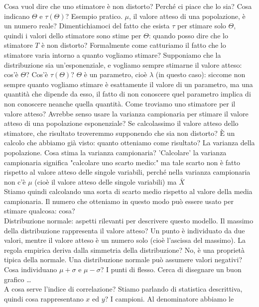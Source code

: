 \documentclass{article}
\begin{document}
    Cosa vuol dire che uno stimatore è non distorto? Perché ci piace che lo sia? Cosa indicano $ \Theta $ e $ \tau ( \Theta ) $? Esempio pratico. $ \mu $, il valore atteso di
    una popolazione, è un numero reale? Dimentichiamoci del fatto che esista $ \tau $ per stimare solo $ \Theta $, quindi i valori dello stimatore sono stime per $ \Theta $:
    quando posso dire che lo stimatore $ T $ è non distorto? Formalmente come catturiamo il fatto che lo stimatore varia intorno a quanto vogliamo stimare? Supponiamo che la
    distribuzione sia un'esponenziale, e vogliamo sempre stimarne il valore atteso: cos'è $ \Theta $? Cos'è $ \tau ( \Theta ) $? $ \Theta $ è un parametro, cioè $ \lambda $
    (in questo caso): siccome non sempre quanto vogliamo stimare è esattamente il valore di un parametro, ma una quantità che dipende da esso, il fatto di non conoscere quel
    parametro implica di non conoscere neanche quella quantità. Come troviamo uno stimatore per il valore atteso? Avrebbe senso usare la varianza campionaria per stimare il
    valore atteso di una popolazione esponenziale? Se calcolassimo il valore atteso dello stimatore, che risultato troveremmo supponendo che sia non distorto? È un calcolo che
    abbiamo già visto: quanto otteniamo come risultato? La varianza della popolazione. Cosa stima la varianza campionaria? 'Calcolare' la varianza campionaria significa
    "calcolare uno scarto medio:" ma tale scarto non è fatto rispetto al valore atteso delle singole variabili, perché nella varianza campionaria non c'è $ \mu $ (cioè il
    valore atteso delle singole variabili) ma $ \bar X $ \\
    Stiamo quindi calcolando una sorta di scarto medio rispetto al valore della media campionaria. Il numero che otteniamo in questo modo può essere usato per stimare
    qualcosa: cosa? \\
    Distribuzione normale: aspetti rilevanti per descrivere questo modello. Il massimo della distribuzione rappresenta il valore atteso? Un punto è individuato da due valori,
    mentre il valore atteso è un numero solo (cioè l'ascissa del massimo). La regola empirica deriva dalla simmetria della distribuzione? No, è una proprietà tipica della
    normale. Una distribuzione normale può assumere valori negativi? Cosa individuano $ \mu + \sigma $ e $ \mu - \sigma $? I punti di flesso. Cerca di disegnare un buon
    grafico … \\
    A cosa serve l'indice di correlazione? Stiamo parlando di statistica descrittiva, quindi cosa rappresentano $ x $ ed $ y $? I campioni. Al denominatore abbiamo le
\end{document}
